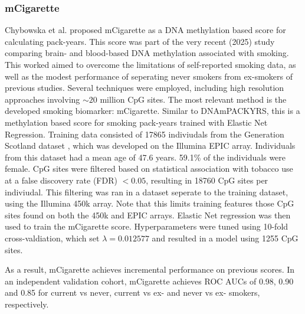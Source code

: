 \documentclass{article}
\begin{document}

\subsubsection{mCigarette} \label{sec:mcigarette}
Chybowska et al. \cite{chybowska2025blood} proposed mCigarette as a DNA methylation based score for calculating pack-years. This score was part of the very recent (2025) study comparing brain- and blood-based DNA methylation associated with smoking. This worked aimed to overcome the limitations of self-reported smoking data, as well as the modest performance of seperating never smokers from ex-smokers of previous studies. Several techniques were employed, including high resolution approaches involving \(\sim \! 20\) million CpG sites. The most relevant method is the developed smoking biomarker: mCigarette. Similar to DNAmPACKYRS, this is a methylation based score for smoking pack-years trained with Elastic Net Regression. Training data consisted of \num{17865} indiviudals from the Generation Scotland dataset \cite{smith2006generation}, which was developed on the Illumina EPIC array. Individuals from this dataset had a mean age of 47.6 years. 59.1\% of the individuals were female. CpG sites were filtered based on statistical association with tobacco use at a false discovery rate (FDR) \(< 0.05\), resulting in \num{18760} CpG sites per indiviudal. This filtering was ran in a dataset seperate to the training dataset, using the Illumina 450k array. Note that this limits training features those CpG sites found on both the 450k and EPIC arrays. Elastic Net regression was then used to train the mCigarette score. Hyperparameters were tuned using 10-fold cross-valdiation, which set \(\lambda = 0.012577\) and resulted in a model using \num{1255} CpG sites.

As a result, mCigarette achieves incremental performance on previous scores. In an independent validation cohort, mCigarette achieves ROC AUCs of 0.98, 0.90 and 0.85 for current vs never, current vs ex- and never vs ex- smokers, respectively.

\end{document}
